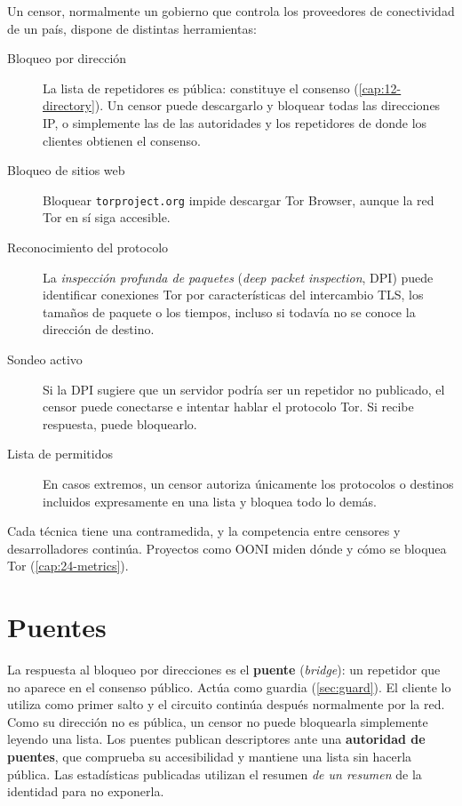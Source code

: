Un censor, normalmente un gobierno que controla los proveedores de conectividad de un país, dispone de distintas herramientas:
\begin{description}
  \item[Bloqueo por dirección] La lista de repetidores es pública: constituye el consenso (\cref{cap:12-directory}). Un censor puede descargarlo y bloquear todas las direcciones IP, o simplemente las de las autoridades y los repetidores de donde los clientes obtienen el consenso.
  \item[Bloqueo de sitios web] Bloquear \texttt{torproject.org} impide descargar Tor Browser, aunque la red Tor en sí siga accesible.
  \item[Reconocimiento del protocolo] La \emph{inspección profunda de paquetes} (\emph{deep packet inspection}, DPI) puede identificar conexiones Tor por características del intercambio TLS, los tamaños de paquete o los tiempos, incluso si todavía no se conoce la dirección de destino.
  \item[Sondeo activo] Si la DPI sugiere que un servidor podría ser un repetidor no publicado, el censor puede conectarse e intentar hablar el protocolo Tor. Si recibe respuesta, puede bloquearlo.
  \item[Lista de permitidos] En casos extremos, un censor autoriza únicamente los protocolos o destinos incluidos expresamente en una lista y bloquea todo lo demás.
\end{description}

Cada técnica tiene una contramedida, y la competencia entre censores y desarrolladores continúa. Proyectos como OONI miden dónde y cómo se bloquea Tor (\cref{cap:24-metrics}).

\section{Puentes}\label{sec:cens-bridge}

La respuesta al bloqueo por direcciones es el \textbf{puente} (\emph{bridge}): un repetidor que no aparece en el consenso público. Actúa como guardia (\cref{sec:guard}). El cliente lo utiliza como primer salto y el circuito continúa después normalmente por la red. Como su dirección no es pública, un censor no puede bloquearla simplemente leyendo una lista. Los puentes publican descriptores ante una \textbf{autoridad de puentes}, que comprueba su accesibilidad y mantiene una lista sin hacerla pública. Las estadísticas publicadas utilizan el resumen \emph{de un resumen} de la identidad para no exponerla.

